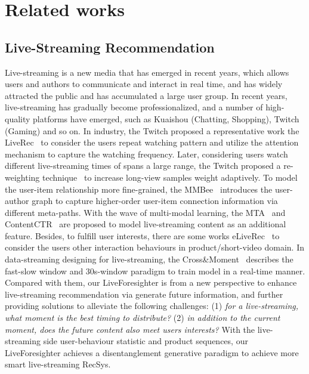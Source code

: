 \section{Related works}
\subsection{Live-Streaming Recommendation}
Live-streaming is a new media that has emerged in recent years, which allows users and authors to communicate and interact in real time, and has widely attracted the public and has accumulated a large user group. 
%
In recent years, live-streaming has gradually become professionalized, and a number of high-quality platforms have emerged, such as Kuaishou (Chatting, Shopping), Twitch (Gaming) and so on.
%
In industry, the Twitch proposed a representative work the LiveRec~\cite{liverec} to consider the users repeat watching pattern and utilize the attention mechanism to capture the watching frequency.
%
Later, considering users watch different live-streaming times of spans a large range, the Twitch proposed a re-weighting technique~\cite{chen2022weighing} to increase long-view samples weight adaptively.
%
To model the user-item relationship more fine-grained, the MMBee~\cite{deng2024mmbee} introduces the user-author graph to capture higher-order user-item connection information via different meta-paths.
%
With the wave of multi-modal learning, the MTA~\cite{xi2023multimodal} and ContentCTR~\cite{contentctr} are proposed to model live-streaming content as an additional feature.
%
Besides, to fulfill user interests, there are some works eLiveRec~\cite{eliverec} to consider the users other interaction behaviours in product/short-video domain.
%
In data-streaming designing for live-streaming, the Cross\&Moment~\cite{cao2024moment} describes the fast-slow window and 30s-window paradigm to train model in a real-time manner.
%
Compared with them, our LiveForesighter is from a new perspective to enhance live-streaming recommendation via generate future information, and further providing solutions to alleviate the following challenges:
%
(1) \textit{for a live-streaming, what moment is the best timing to distribute?}
%
(2) \textit{in addition to the current moment, does the future content also meet users interests?}
%
With the live-streaming side user-behaviour statistic and product sequences, our LiveForesighter achieves a disentanglement generative paradigm to achieve more smart live-streaming RecSys.







